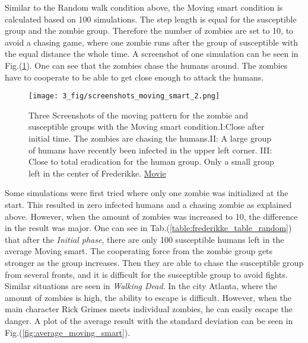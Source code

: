 \documentclass[%
twoside,                 %
final,                   %
chapterprefix=true,      %
open=right               %
10pt]{book}
\begin{document}
\vspace{3mm}




\vspace{3mm}


Similar to the Random walk condition above, the Moving smart condition is calculated based on 100 simulations. The step length is equal for the susceptible group and the zombie group. Therefore the number of zombies are set to 10, to avoid a chasing game, where one zombie runs after the group of susceptible with the equal distance the whole time. A screenshot of one simulation can be seen in Fig.(\ref{fig:screenshot_moving_smart}). One can see that the zombies chase the humans around. The zombies have to cooperate to be able to get close enough to attack the humans.  


\vspace{3mm}




\vspace{3mm}




\begin{figure}[ht]
  \centerline{\texttt{[image: 3\_fig/screenshots\_moving\_smart\_2.png]}}
  \caption{
  \label{fig:screenshot_moving_smart} Three Screenshots of the moving pattern for the zombie and susceptible groups with the Moving smart condition.I:Close after initial time. The zombies are chasing the humans.II: A large group of humans have recently been infected in the upper left corner. III: Close to total eradication for the human group. Only a small group left in the center of Frederikke. \href{{https://torbjornseland.github.io/master}}{Movie}
  }
\end{figure}


Some simulations were first tried where only one zombie was initialized at the start. This resulted in zero infected humans and a chasing zombie as explained above. However, when the amount of zombies was increased to 10, the difference in the result was major. One can see in Tab.(\ref{table:frederikke_table_random}) that after the \emph{Initial phase}, there are only 100 susceptible humans left in the average Moving smart. The cooperating force from the zombie group gets stronger as the group increases. Then they are able to chase the susceptible group from several fronts, and it is difficult for the susceptible group to avoid fights. Similar situations are seen in \emph{Walking Dead}. In the city Atlanta, where the amount of zombies is high, the ability to escape is difficult. However, when the main character Rick Grimes meets individual zombies, he can easily escape the danger. A plot of the average result with the standard deviation can be seen in Fig.(\ref{fig:average_moving_smart}). 
\end{document}

